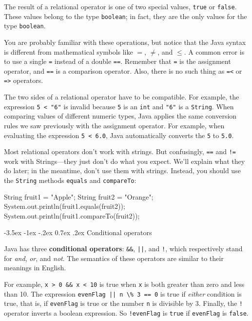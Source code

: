 \documentclass[12pt]{book}
\makeatletter
\renewcommand{\section}{\@startsection {section}{1}{\z@}%
    {-3.5ex \@plus -1ex \@minus -.2ex}%
    {0.7ex \@plus.2ex}%
    {\normalfont\Large\bfseries}}
\theoremstyle{exercise}
\newcommand{\java}[1]{\lstinline{#1}} %
\makeatother
\begin{document}
The result of a relational operator is one of two special values, \java{true} or \java{false}.
These values belong to the type \java{boolean}; in fact, they are the only values for the type \java{boolean}.

You are probably familiar with these operations, but notice that the Java syntax is different from mathematical symbols like $=$, $\neq$, and $\le$.
A common error is to use a single \java{=} instead of a double \java{==}.
Remember that \java{=} is the assignment operator, and \java{==} is a comparison operator.
Also, there is no such thing as \java{=<} or \java{=>} operators.

The two sides of a relational operator have to be compatible.
For example, the expression \java{5 < "6"} is invalid because \java{5} is an \java{int} and \java{"6"} is a \java{String}.
When comparing values of different numeric types, Java applies the same conversion rules we saw previously with the assignment operator.
For example, when evaluating the expression \java{5 < 6.0}, Java automatically converts the \java{5} to \java{5.0}.

Most relational operators don't work with strings.
But confusingly, \java{==} and \java{!=} work with Strings---they just don't do what you expect.
We'll explain what they do later; in the meantime, don't use them with strings.
Instead, you should use the \java{String} methods \java{equals} and \java{compareTo}:

\begin{code}
    String fruit1 = "Apple";
    String fruit2 = "Orange";
    System.out.println(fruit1.equals(fruit2));
    System.out.println(fruit1.compareTo(fruit2));
\end{code}


\section{Conditional operators}


Java has three {\bf conditional operators}: \java{&&}, \java{||}, and \java{!}, which respectively stand for {\it and}, {\it or}, and {\it not}.
The semantics of these operators are similar to their meanings in English.

For example, \java{x > 0 && x < 10} is true when \java{x} is both greater than zero and less than 10.
The expression \java{evenFlag || n \% 3 == 0} is true if {\it either} condition is true, that is, if \java{evenFlag} is true or the number \java{n} is divisible by 3.
Finally, the \java{!} operator inverts a boolean expression.
So \java{!evenFlag} is \java{true} if \java{evenFlag} is \java{false}.
\end{document}
